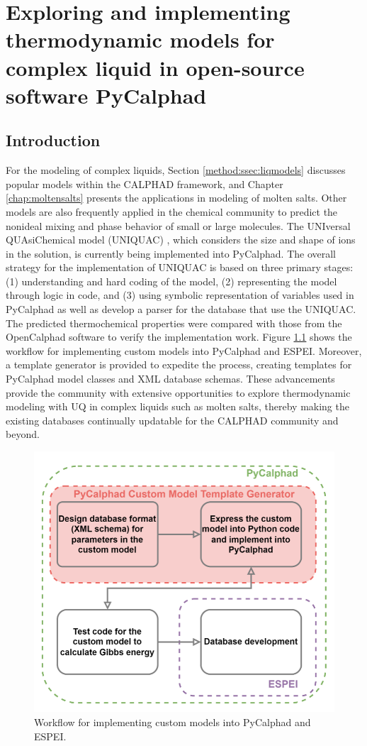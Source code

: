 \chapter{Exploring and implementing thermodynamic models for complex liquid in open-source software PyCalphad} \label{chap:models}

\section{Introduction} \label{models:sec:intro}
For the modeling of complex liquids, Section \ref{method:ssec:liqmodels} discusses popular models within the CALPHAD framework, and Chapter \ref{chap:moltensalts} presents the applications in modeling of molten salts. Other models are also frequently applied in the chemical community to predict the nonideal mixing and phase behavior of small or large molecules. The UNIversal QUAsiChemical model (UNIQUAC) \cite{abrams1975statistical}, which considers the size and shape of ions in the solution, is currently being implemented into PyCalphad. The overall strategy for the implementation of UNIQUAC is based on three primary stages: (1) understanding and hard coding of the model, (2) representing the model through logic in code, and (3) using symbolic representation of variables used in PyCalphad as well as develop a parser for the database that use the UNIQUAC. The predicted thermochemical properties were compared with those from the OpenCalphad software \cite{li2020implementation} to verify the implementation work. Figure \ref{models:fig:implflow} shows the workflow for implementing custom models into PyCalphad and ESPEI. Moreover, a template generator is provided to expedite the process, creating templates for PyCalphad model classes and XML database schemas. These advancements provide the community with extensive opportunities to explore thermodynamic modeling with UQ in complex liquids such as molten salts, thereby making the existing databases continually updatable for the CALPHAD community and beyond. 

\begin{figure}[H]
    \centering
    \includegraphics[width=0.75\linewidth]{models/Models-ImplementationFlow.png}
    \caption{Workflow for implementing custom models into PyCalphad and ESPEI.}
    \label{models:fig:implflow}
\end{figure}

